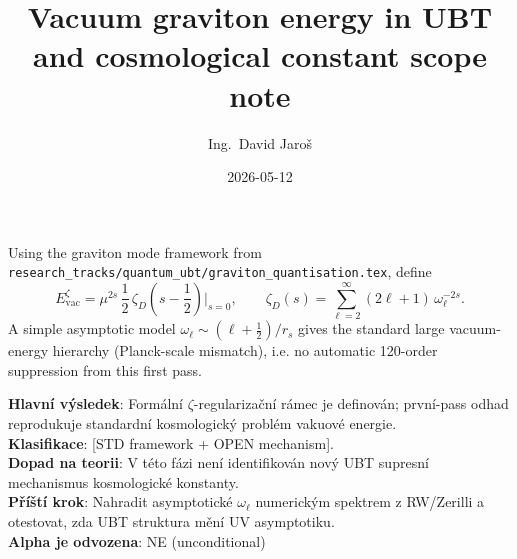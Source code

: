 \documentclass[12pt,a4paper]{article}
\title{Vacuum graviton energy in UBT and cosmological constant scope note}
\author{Ing.\ David Jaroš}
\date{2026-05-12}
\begin{document}
\maketitle

Using the graviton mode framework from
\texttt{research\_tracks/quantum\_ubt/graviton\_quantisation.tex}, define
\[
E_{\mathrm{vac}}^\zeta = \mu^{2s}\,\frac12\,\zeta_D\!\left(s-\frac12\right)\Big|_{s=0},
\qquad
\zeta_D(s)=\sum_{\ell=2}^{\infty}(2\ell+1)\,\omega_\ell^{-2s}.
\]
A simple asymptotic model $\omega_\ell\sim (\ell+\tfrac12)/r_s$ gives the standard
large vacuum-energy hierarchy (Planck-scale mismatch), i.e. no automatic
120-order suppression from this first pass.

\begin{statusbox}
\textbf{Hlavní výsledek}: Formální $\zeta$-regularizační rámec je definován; první-pass odhad reprodukuje standardní kosmologický problém vakuové energie.\\
\textbf{Klasifikace}: [STD framework + OPEN mechanism].\\
\textbf{Dopad na teorii}: V této fázi není identifikován nový UBT supresní mechanismus kosmologické konstanty.\\
\textbf{Příští krok}: Nahradit asymptotické $\omega_\ell$ numerickým spektrem z RW/Zerilli a otestovat, zda UBT struktura mění UV asymptotiku.\\
\textbf{Alpha je odvozena}: NE (unconditional)
\end{statusbox}
\end{document}
